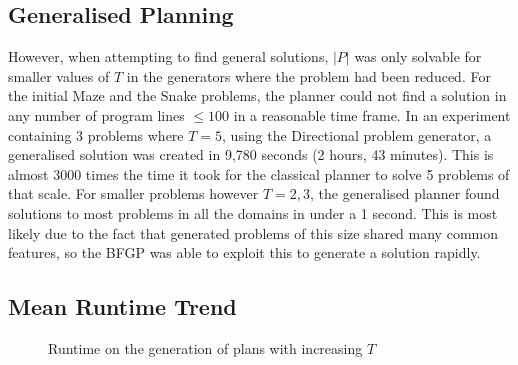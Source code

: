 \subsection{Generalised Planning}
However, when attempting to find general solutions, $|P|$ was only solvable for smaller values of $T$ in the generators where the problem had been reduced. For the initial Maze and the Snake problems, the planner could not find a solution in any number of program lines $\leq 100$ in a reasonable time frame. In an experiment containing 3 problems where $T = 5$, using the Directional problem generator, a generalised solution was created in 9,780 seconds (2 hours, 43 minutes). This is almost 3000 times the time it took for the classical planner to solve 5 problems of that scale. For smaller problems however $T = 2, 3$, the generalised planner found solutions to most problems in all the domains in under a 1 second. This is most likely due to the fact that generated problems of this size shared many common features, so the BFGP was able to exploit this to generate a solution rapidly.

\subsection{Mean Runtime Trend}
\begin{figure}[h!]
    \centering
{}
\caption{Runtime on the generation of plans with increasing $T$}
\end{figure}

